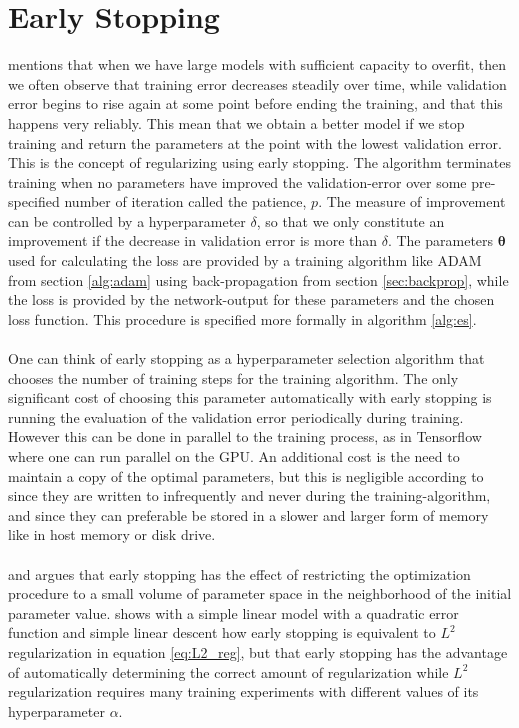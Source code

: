 \section{Early Stopping} \label{sec:early_stopping}
\cite{Goodfellow-et-al-2016} mentions that when we have large models with sufficient capacity to overfit, then we often observe that training error decreases steadily over time, while validation error begins to rise again at some point before ending the training, and that this happens very reliably. This mean that we obtain a better model if we stop training and return the parameters at the point with the lowest validation error. This is the concept of regularizing using early stopping. The algorithm terminates training when no parameters have improved the validation-error over some pre-specified number of iteration called the patience, $p$. The measure of improvement can be controlled by a hyperparameter $\delta$, so that we only constitute an improvement if the decrease in validation error is more than $\delta$. The parameters $\boldsymbol{\theta}$ used for calculating the loss are provided by a training algorithm like ADAM from section \ref{alg:adam} using back-propagation from section \ref{sec:backprop}, while the loss is provided by the network-output for these parameters and the chosen loss function. This procedure is specified more formally in algorithm \ref{alg:es}.\\
\\
One can think of early stopping as a hyperparameter selection algorithm that chooses the number of training steps for the training algorithm. The only significant cost of choosing this parameter automatically with early stopping is running the evaluation of the validation error periodically during training. However this can be done in parallel to the training process, as in Tensorflow where one can run parallel on the GPU. An additional cost is the need to maintain a copy of the optimal parameters, but this is negligible according to \cite{Goodfellow-et-al-2016} since they are written to infrequently and never during the training-algorithm, and since they can preferable be stored in a slower and larger form of memory like in host memory or disk drive. \\
\\
\cite{bishop1995} and \cite{sjoberg_ljung1995} argues that early stopping has the effect of restricting the optimization procedure to a small volume of parameter space in the neighborhood of the initial parameter value. \cite{Goodfellow-et-al-2016} shows with a simple linear model with a quadratic error function and simple linear descent how early stopping is equivalent to $L^2$ regularization in equation \ref{eq:L2_reg}, but that early stopping has the advantage of automatically determining the correct amount of regularization while $L^2$ regularization requires many training experiments with different values of its hyperparameter $\alpha$. 



